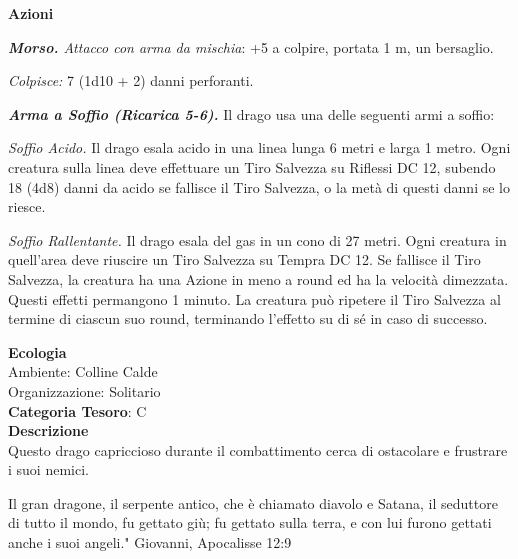 \begin{multicols}{2}
{\textbf{Azioni}

\emph{\textbf{Morso.} Attacco con arma da mischia}: +5 a colpire, portata 1 m, un bersaglio.

\emph{Colpisce:} 7 (1d10 + 2) danni perforanti.

\emph{\textbf{Arma a Soffio (Ricarica 5-6).}} Il drago usa una delle seguenti armi a soffio:

\emph{Soffio Acido.} Il drago esala acido in una linea lunga 6 metri e larga 1 metro. Ogni creatura sulla linea deve effettuare un Tiro Salvezza su Riflessi DC 12, subendo 18 (4d8) danni da acido se fallisce il Tiro Salvezza, o la metà di questi danni se lo riesce.

\emph{Soffio Rallentante.} Il drago esala del gas in un cono di 27 metri. Ogni creatura in quell'area deve riuscire un Tiro Salvezza su Tempra DC 12. Se fallisce il Tiro Salvezza, la creatura ha una Azione in meno a round ed ha la velocità dimezzata. Questi effetti permangono 1 minuto. La creatura può ripetere il Tiro Salvezza al termine di ciascun suo round, terminando l'effetto su di sé in caso di successo.

\textbf{Ecologia}\\
Ambiente: Colline Calde\\
Organizzazione: Solitario\\
\textbf{Categoria Tesoro}: C\\
\textbf{Descrizione}\\
Questo drago capriccioso durante il combattimento cerca di ostacolare e frustrare i suoi nemici.

\begin{enfasi}{Il gran dragone, il serpente antico, che è chiamato diavolo e Satana, il seduttore di tutto il mondo, fu gettato giù; fu gettato sulla terra, e con lui furono gettati anche i suoi angeli." Giovanni, Apocalisse 12:9}\end{enfasi}

}
\end{multicols}
